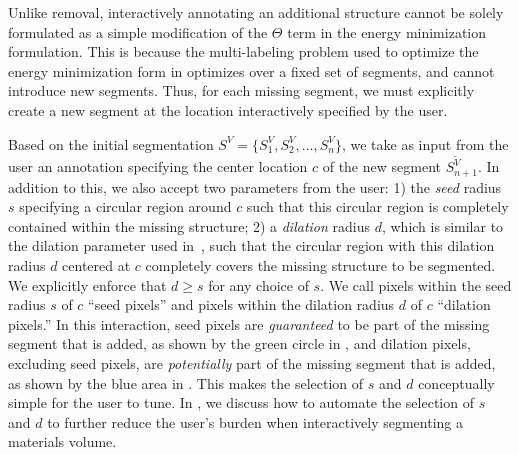 \documentclass[]{spie}  %
\begin{document}
Unlike removal, interactively annotating an additional structure
cannot be solely formulated as a simple modification of the $\Theta$
term in the energy minimization formulation.  This is because the
multi-labeling problem used to optimize the energy minimization form
in  optimizes over a fixed set of segments, and cannot
introduce new segments.  Thus, for each missing segment, we must
explicitly create a new segment at the location interactively
specified by the user.

Based on the initial segmentation $S^V = \{ S^V_1, S^V_2, \ldots,
S^V_n \} $, we take as input from the user an annotation specifying
the center location $c$ of the new segment $S^{\tilde{V}}_{n+1}$.  In
addition to this, we also accept two parameters from the user: 1) the
\emph{seed} radius $s$ specifying a circular region around $c$ such
that this circular region is completely contained within the missing
structure; 2) a \textit{dilation} radius $d$, which is similar to the
dilation parameter used in~\cite{waggoner:11}, such that the circular
region with this dilation radius $d$ centered at $c$ completely covers
the missing structure to be segmented.  We explicitly enforce that $d
\geq s$ for any choice of $s$.  We call pixels within the seed radius
$s$ of $c$ ``seed pixels'' and pixels within the dilation radius $d$
of $c$ ``dilation pixels.''  In this interaction, seed pixels are
\emph{guaranteed} to be part of the missing segment that is added, as
shown by the green circle in , and dilation
pixels, excluding seed pixels, are \emph{potentially} part of the
missing segment that is added, as shown by the blue area in
.  This makes the selection of $s$ and $d$
conceptually simple for the user to tune.  In , we discuss
how to automate the selection of $s$ and $d$ to further reduce the
user's burden when interactively segmenting a materials volume.
\end{document}
